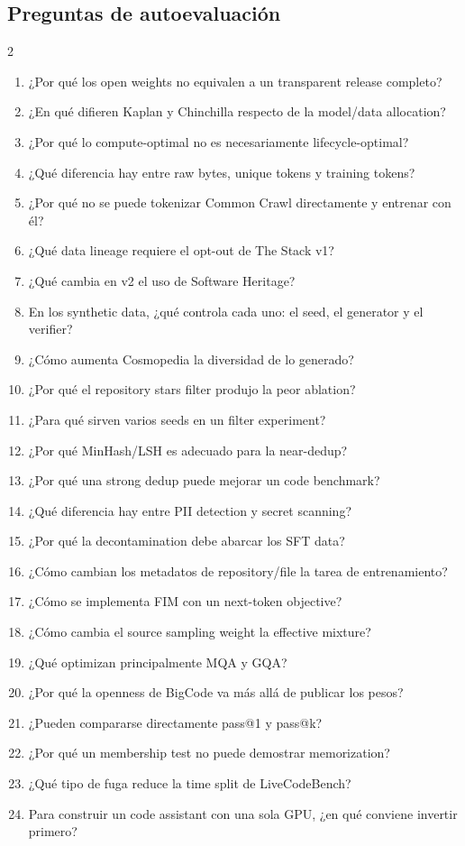 \documentclass[a4paper]{article}
\begin{document}
\subsection{Preguntas de autoevaluación}

\begin{multicols}{2}
\footnotesize
\begin{enumerate}
  \setlength{\itemsep}{0pt}
  \item ¿Por qué los open weights no equivalen a un transparent release completo?
  \item ¿En qué difieren Kaplan y Chinchilla respecto de la model/data allocation?
  \item ¿Por qué lo compute-optimal no es necesariamente lifecycle-optimal?
  \item ¿Qué diferencia hay entre raw bytes, unique tokens y training tokens?
  \item ¿Por qué no se puede tokenizar Common Crawl directamente y entrenar con él?
  \item ¿Qué data lineage requiere el opt-out de The Stack v1?
  \item ¿Qué cambia en v2 el uso de Software Heritage?
  \item En los synthetic data, ¿qué controla cada uno: el seed, el generator y el verifier?
  \item ¿Cómo aumenta Cosmopedia la diversidad de lo generado?
  \item ¿Por qué el repository stars filter produjo la peor ablation?
  \item ¿Para qué sirven varios seeds en un filter experiment?
  \item ¿Por qué MinHash/LSH es adecuado para la near-dedup?
  \item ¿Por qué una strong dedup puede mejorar un code benchmark?
  \item ¿Qué diferencia hay entre PII detection y secret scanning?
  \item ¿Por qué la decontamination debe abarcar los SFT data?
  \item ¿Cómo cambian los metadatos de repository/file la tarea de entrenamiento?
  \item ¿Cómo se implementa FIM con un next-token objective?
  \item ¿Cómo cambia el source sampling weight la effective mixture?
  \item ¿Qué optimizan principalmente MQA y GQA?
  \item ¿Por qué la openness de BigCode va más allá de publicar los pesos?
  \item ¿Pueden compararse directamente pass@1 y pass@k?
  \item ¿Por qué un membership test no puede demostrar memorization?
  \item ¿Qué tipo de fuga reduce la time split de LiveCodeBench?
  \item Para construir un code assistant con una sola GPU, ¿en qué conviene invertir primero?
\end{enumerate}
\end{multicols}
\end{document}
